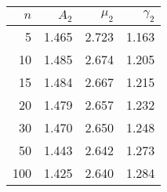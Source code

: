 \begin{tabular}{rrrr}
\toprule
 $n$ &  $A_2$ &  $\mu_2$ &  $\gamma_2$ \\
\midrule
   5 &  1.465 &    2.723 &       1.163 \\
  10 &  1.485 &    2.674 &       1.205 \\
  15 &  1.484 &    2.667 &       1.215 \\
  20 &  1.479 &    2.657 &       1.232 \\
  30 &  1.470 &    2.650 &       1.248 \\
  50 &  1.443 &    2.642 &       1.273 \\
 100 &  1.425 &    2.640 &       1.284 \\
\bottomrule
\end{tabular}
